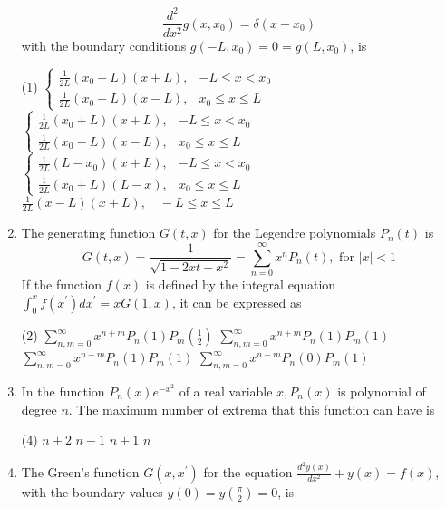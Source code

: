 \begin{enumerate}[label=\color{ocre}\textbf{\arabic*.}]
	$$
	\frac{d^{2}}{d x^{2}} g\left(x, x_{0}\right)=\delta\left(x-x_{0}\right)
	$$
	with the boundary conditions $g\left(-L, x_{0}\right)=0=g\left(L, x_{0}\right)$, is
	{}
	\begin{tasks}(1)
		\task[\textbf{A.}] $\left\{\begin{array}{ll}\frac{1}{2 L}\left(x_{0}-L\right)(x+L), & -L \leq x<x_{0} \\ \frac{1}{2 L}\left(x_{0}+L\right)(x-L), & x_{0} \leq x \leq L\end{array}\right.$
		\task[\textbf{B.}]  $\left\{\begin{array}{ll}\frac{1}{2 L}\left(x_{0}+L\right)(x+L), & -L \leq x<x_{0} \\ \frac{1}{2 L}\left(x_{0}-L\right)(x-L), & x_{0} \leq x \leq L\end{array}\right.$
		\task[\textbf{C.}] $\left\{\begin{array}{ll}\frac{1}{2 L}\left(L-x_{0}\right)(x+L), & -L \leq x<x_{0} \\ \frac{1}{2 L}\left(x_{0}+L\right)(L-x), & x_{0} \leq x \leq L\end{array}\right.$
		\task[\textbf{D.}] $\frac{1}{2 L}(x-L)(x+L), \quad-L \leq x \leq L$
	\end{tasks}
	\item  The generating function $G(t, x)$ for the Legendre polynomials $P_{n}(t)$ is
	$$
	G(t, x)=\frac{1}{\sqrt{1-2 x t+x^{2}}}=\sum_{n=0}^{\infty} x^{n} P_{n}(t), \text { for }|x|<1
	$$
	If the function $f(x)$ is defined by the integral equation $\int_{0}^{x} f\left(x^{\prime}\right) d x^{\prime}=x G(1, x)$, it can be expressed as
	{}
	\begin{tasks}(2)
		\task[\textbf{A.}] $\sum_{n, m=0}^{\infty} x^{n+m} P_{n}(1) P_{m}\left(\frac{1}{2}\right)$
		\task[\textbf{B.}] $\sum_{n, m=0}^{\infty} x^{n+m} P_{n}(1) P_{m}(1)$
		\task[\textbf{C.}] $\sum_{n, m=0}^{\infty} x^{n-m} P_{n}(1) P_{m}(1)$
		\task[\textbf{D.}] $\sum_{n, m=0}^{\infty} x^{n-m} P_{n}(0) P_{m}(1)$
	\end{tasks}
	\item In the function $P_{n}(x) e^{-x^{2}}$ of a real variable $x, P_{n}(x)$ is polynomial of degree $n$. The maximum number of extrema that this function can have is
	{}
	\begin{tasks}(4)
		\task[\textbf{A.}] $n+2$
		\task[\textbf{B.}]  $n-1$
		\task[\textbf{C.}] $n+1$
		\task[\textbf{D.}] $n$
	\end{tasks}
	\item  The Green's function $G\left(x, x^{\prime}\right)$ for the equation $\frac{d^{2} y(x)}{d x^{2}}+y(x)=f(x)$, with the boundary values $y(0)=y\left(\frac{\pi}{2}\right)=0$, is

\end{enumerate}
